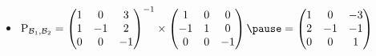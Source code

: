 \begin{frame}
\begin{exemple}
\begin{itemize}
\pause
  \item  $\Pass_{\mathcal{B}_1, \mathcal{B}_2} =
\begin{pmatrix}
1 & 0 & 3\\
1 & -1 & 2\\
0 & 0 &-1
\end{pmatrix}^{-1}
\times 
\begin{pmatrix}
1 & 0 & 0\\
-1 & 1 & 0\\
0 & 0 &-1
\end{pmatrix}
\pause
=  \begin{pmatrix}
1 & 0 & -3\\
2 & -1 & -1\\
0 & 0 & 1
\end{pmatrix}$
  
\end{itemize}

\end{exemple}
\end{frame}


